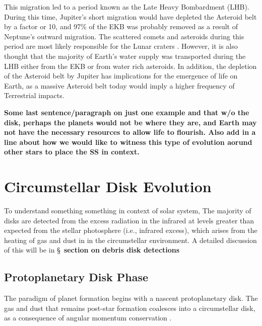     This migration led to a period known as the Late Heavy Bombardment (LHB). During this time, Jupiter's short migration would have depleted the Asteroid belt by a factor or 10, and 97\% of the EKB was probably removed as a result of Neptune's outward migration. The scattered comets and asteroids during this period are most likely responsible for the Lunar craters \citep{Gomes2005}. However, it is also thought that the majority of Earth's water supply was transported during the LHB either from the EKB or from water rich asteroids. In addition, the depletion of the Asteroid belt by Jupiter has implications for the emergence of life on Earth, as a massive Asteroid belt today would imply a higher frequency of Terrestrial impacts. 
    
    \textbf{Some last sentence/paragraph on just one example and that w/o the disk, perhaps the planets would not be where they are, and Earth may not have the necessary resources to allow life to flourish. Also add in a line about how we would like to witness this type of evolution aorund other stars to place the SS in context.}
    
    



\section{Circumstellar Disk Evolution}
    
    To understand something something in context of solar system, 
    The majority of disks are detected from the excess radiation in the infrared at levels greater than expected from the stellar photosphere (i.e., infrared excess), which arises from the heating of gas and dust in in the circumstellar environment. A detailed discussion of this will be in \S~\textbf{section on debris disk detections}

    \subsection{Protoplanetary Disk Phase}
    
    The paradigm of planet formation begins with a nascent protoplanetary disk. The gas and dust that remains post-star formation coalesces into a circumstellar disk, as a consequence of angular momentum conservation \citet{Terebey1984}. 
    
